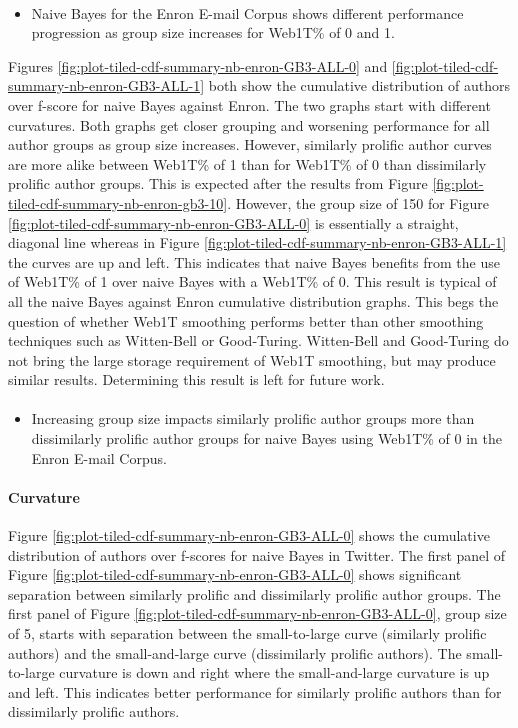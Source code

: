 \paragraph*{} 
\begin{itemize}
\item Naive Bayes for the Enron E-mail Corpus shows different performance progression as group size increases for Web1T\% of 0 and 1.
\end{itemize}
Figures \ref{fig:plot-tiled-cdf-summary-nb-enron-GB3-ALL-0} and \ref{fig:plot-tiled-cdf-summary-nb-enron-GB3-ALL-1} both show the cumulative distribution of authors over f-score for naive Bayes against Enron.  The two graphs start with different curvatures.  Both graphs get closer grouping and worsening performance for all author groups as group size increases.  However, similarly prolific author curves are more alike between Web1T\% of 1 than for Web1T\% of 0 than dissimilarly prolific author groups.  This is expected after the results from Figure \ref{fig:plot-tiled-cdf-summary-nb-enron-gb3-10}. However, the group size of 150 for Figure \ref{fig:plot-tiled-cdf-summary-nb-enron-GB3-ALL-0} is essentially a straight, diagonal line whereas in Figure \ref{fig:plot-tiled-cdf-summary-nb-enron-GB3-ALL-1} the curves are up and left.  This indicates that naive Bayes benefits from the use of Web1T\% of 1 over naive Bayes with a Web1T\% of 0.  This result is typical of all the naive Bayes against Enron cumulative distribution graphs.  This begs the question of whether Web1T smoothing performs better than other smoothing techniques such as Witten-Bell or Good-Turing.  Witten-Bell and Good-Turing do not bring the large storage requirement of Web1T smoothing, but may produce similar results.  Determining this result is left for future work.

\paragraph*{} 
\begin{itemize}
\item Increasing group size impacts similarly prolific author groups more than dissimilarly prolific author groups for naive Bayes using Web1T\% of 0 in the Enron E-mail Corpus.
\end{itemize}
\paragraph*{Curvature} Figure \ref{fig:plot-tiled-cdf-summary-nb-enron-GB3-ALL-0} shows the cumulative distribution of authors over f-scores for naive Bayes in Twitter.  The first panel of Figure \ref{fig:plot-tiled-cdf-summary-nb-enron-GB3-ALL-0} shows significant separation between similarly prolific and dissimilarly prolific author groups. The first panel of Figure \ref{fig:plot-tiled-cdf-summary-nb-enron-GB3-ALL-0}, group size of 5, starts with separation between the small-to-large curve (similarly prolific authors) and the small-and-large curve (dissimilarly prolific authors).  The small-to-large curvature is down and right where the small-and-large curvature is up and left.  This indicates better performance for similarly prolific authors than for dissimilarly prolific authors. 
